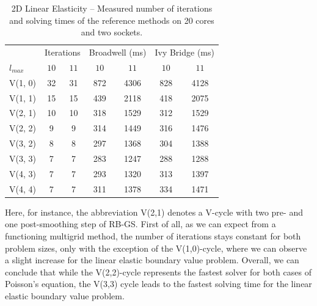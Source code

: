 \begin{table}
	\caption{2D Linear Elasticity -- Measured number of iterations and solving times of the reference methods on 20 cores and two sockets.}
	\label{table:linear-elasticity-2D-reference-methods}
	\centering
	\begin{tabular}{l c c c c c c}
		\toprule
		& \multicolumn{2}{c}{Iterations} & \multicolumn{2}{c}{Broadwell (ms)} & \multicolumn{2}{c}{Ivy Bridge (ms)} \\
		\cmidrule(r){2-3} \cmidrule(r){4-5} \cmidrule(r){6-7}
		$l_{max}$ & $10$& $11$ & $10$ & $11$ & $10$ & $11$\\
		\midrule
		V(1, 0) & 32 & 31 & 872 & 4306 & 828 & 4128 \\
		\midrule
		V(1, 1) & 15 & 15 & 439 & 2118 & 418 & 2075\\
		\midrule
		V(2, 1) & 10 & 10 & 318 & 1529 & 312 & 1529 \\
		\midrule
		V(2, 2) & 9 & 9 & 314 & 1449 & 316 & 1476 \\
		\midrule
		V(3, 2) & 8 & 8 & 297 & 1368 & 304 & 1388 \\
		\midrule
		V(3, 3) & 7 & 7 & 283 & 1247 & 288 & 1288 \\
		\midrule
		V(4, 3) & 7 & 7 & 293 & 1320 & 313 & 1397 \\
		\midrule
		V(4, 4) & 7 & 7 & 311 & 1378 & 334 & 1471 \\
		\bottomrule
	\end{tabular}
\end{table}
Here, for instance, the abbreviation V(2,1) denotes a V-cycle with two pre- and one post-smoothing step of RB-GS.
First of all, as we can expect from a functioning multigrid method, the number of iterations stays constant for both problem sizes, only with the exception of the V(1,0)-cycle, where we can observe a slight increase for the linear elastic boundary value problem.
Overall, we can conclude that while the V(2,2)-cycle represents the fastest solver for both cases of Poisson's equation, the V(3,3) cycle leads to the fastest solving time for the linear elastic boundary value problem.

